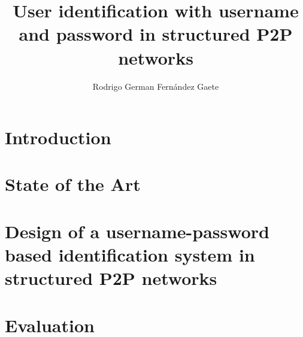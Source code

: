 \documentclass[letter, 12pt]{report}
\title{User identification with username and password in structured P2P networks}
\author{Rodrigo German Fernández Gaete}
\begin{document}


\beforepreface



%


\newpage

\afterpreface


\renewcommand{\chaptername}{Chapter}
\setcounter{secnumdepth}{3}
\setcounter{tocdepth}{3}

\chapter{Introduction}
\label{sec:intro}



\chapter{State of the Art}
\label{sec:soa_p2p}


\label{sec:soa_p2p_user_identification}


\chapter{Design of a username-password based identification system in structured P2P networks}
\label{sec:system}


\chapter{Evaluation}
\label{sec:evaluation}


\end{document}
